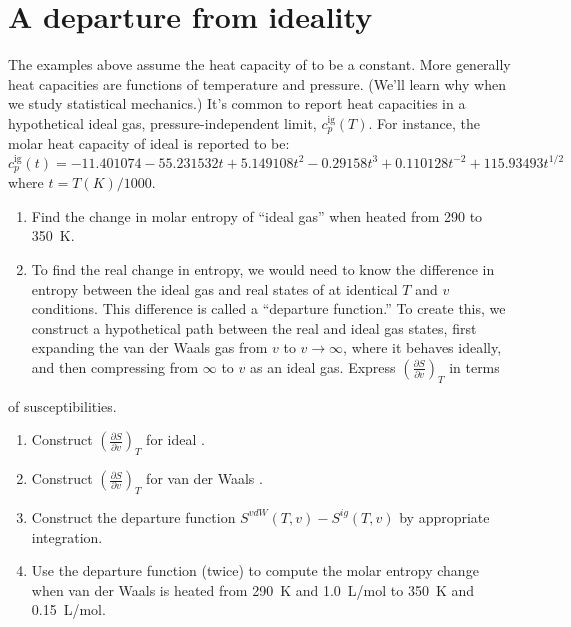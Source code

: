 \documentclass[11pt]{article}
\begin{document}
\section{A departure from ideality}
\label{sec:org5081816}
The examples above assume the heat capacity of  to be a constant. More
generally heat capacities are functions of temperature and pressure. (We'll learn why when
we study statistical mechanics.)  It's common to report heat capacities in a hypothetical
ideal gas, pressure-independent limit, \(c_{p}^\text{ig}(T)\).  For instance, the molar heat
capacity of ideal  is reported to be:
\begin{equation*}
  c_p^\text{ig}(t) = -11.401074 - 55.231532t+5.149108t^2-0.29158t^3+0.110128t^{-2}+115.93493t^{1/2}
\end{equation*}
where \(t=T(K)/1000\).

\begin{enumerate}
\item Find the change in molar entropy of ``ideal gas''  when heated from 290 to
\SI{350}{K}.

\item To find the real change in entropy, we would need to know the difference in entropy
between the ideal gas and real states of  at identical \(T\) and \(v\) conditions.  This
difference is called a ``departure function.'' To create this, we construct a hypothetical
path between the real and ideal gas states, first expanding the van der Waals gas
from \(v\) to \(v\rightarrow \infty\), where it behaves ideally, and then compressing from \(\infty\)
to \(v\) as an ideal gas.  Express \(\left ( \frac{\partial S}{\partial v}\right )_{T}\) in terms
\end{enumerate}
of susceptibilities.

\begin{enumerate}
\item Construct \(\left ( \frac{\partial S}{\partial v}\right)_{T}\) for ideal .

\item Construct \(\left ( \frac{\partial S}{\partial v}\right)_{T}\) for van der Waals
.

\item Construct the departure function \(S^{vdW}(T,v) - S^{ig}(T,v)\) by appropriate integration.

\item Use the departure function (twice) to compute the molar entropy change when van der Waals
 is heated from \SI{290}{K} and \SI{1.0}{L/mol} to \SI{350}{K} and \SI{0.15}{L/mol}.
\end{enumerate}
\end{document}
